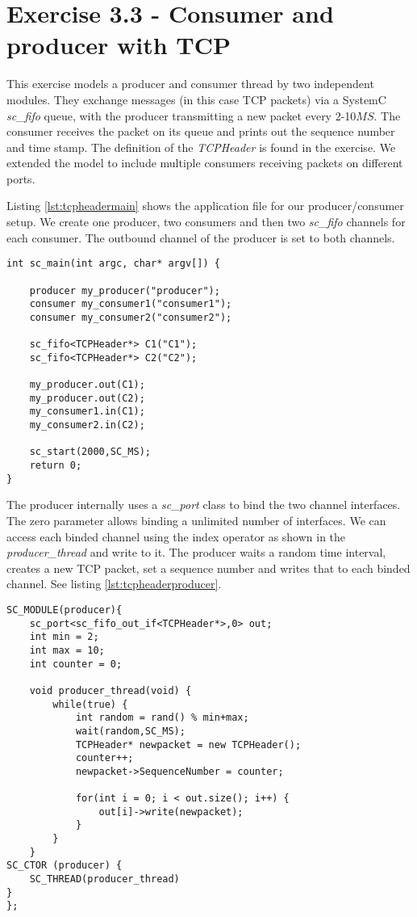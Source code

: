 \section{Exercise 3.3 - Consumer and producer with TCP}

This exercise models a producer and consumer thread by two independent modules. They exchange messages (in this case TCP packets) via a SystemC \textit{sc\_fifo} queue, with the producer transmitting a new packet every 2-10$MS$. The consumer receives the packet on its queue and prints out the sequence number and time stamp. The definition of the \textit{TCPHeader} is found in the exercise. We extended the model to include multiple consumers receiving packets on different ports.

\noindent Listing \ref{lst:tcpheadermain} shows the application file for our producer/consumer setup. We create one producer, two consumers and then two \textit{sc\_fifo} channels for each consumer. The outbound channel of the producer is set to both channels.

\begin{lstlisting}[style=customc++, caption=Application file for producer/consumer.,
label={lst:tcpheadermain}]
int sc_main(int argc, char* argv[]) {

	producer my_producer("producer");
	consumer my_consumer1("consumer1");
	consumer my_consumer2("consumer2");

	sc_fifo<TCPHeader*> C1("C1");
	sc_fifo<TCPHeader*> C2("C2");

	my_producer.out(C1);
	my_producer.out(C2);
	my_consumer1.in(C1);
	my_consumer2.in(C2);

	sc_start(2000,SC_MS);
	return 0;
}
\end{lstlisting}

\noindent The producer internally uses a \textit{sc\_port} class to bind the two channel interfaces. The zero parameter allows binding a unlimited number of interfaces. We can access each binded channel using the index operator as shown in the \textit{producer\_thread} and write to it. The producer waits a random time interval, creates a new TCP packet, set a sequence number and writes that to each binded channel. See listing \ref{lst:tcpheaderproducer}.

\begin{lstlisting}[style=customc++, caption=Implementation of TCP producer.,
label={lst:tcpheaderproducer}]
SC_MODULE(producer){
	sc_port<sc_fifo_out_if<TCPHeader*>,0> out;
	int min = 2;
	int max = 10;
	int counter = 0;

	void producer_thread(void) {
		while(true) {
			int random = rand() % min+max;
			wait(random,SC_MS);
			TCPHeader* newpacket = new TCPHeader();
			counter++;
			newpacket->SequenceNumber = counter;

			for(int i = 0; i < out.size(); i++) {
				out[i]->write(newpacket);
			}
		}
	}
SC_CTOR (producer) {
	SC_THREAD(producer_thread)
}
};
\end{lstlisting}

